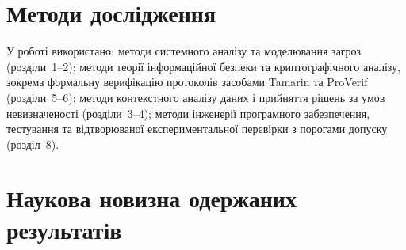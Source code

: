 \section*{Методи дослідження}

У роботі використано: методи системного аналізу та моделювання загроз (розділи~1--2); методи теорії інформаційної безпеки та криптографічного аналізу, зокрема формальну верифікацію протоколів засобами Tamarin та ProVerif (розділи~5--6); методи контекстного аналізу даних і прийняття рішень за умов невизначеності (розділи~3--4); методи інженерії програмного забезпечення, тестування та відтворюваної експериментальної перевірки з порогами допуску (розділ~8).

\section*{Наукова новизна одержаних результатів}

